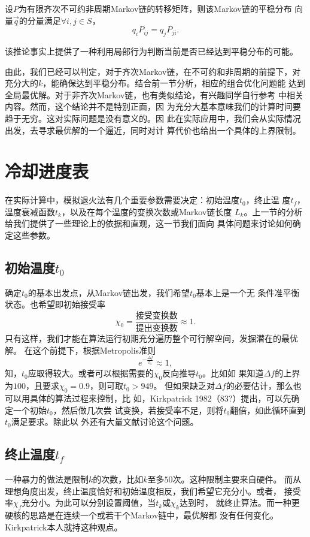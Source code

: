 \begin{corollary}{} 设$P$为有限齐次不可约非周期Markov链的转移矩阵，则该Markov链的平稳分布
  向量$\vec{q}$的分量满足$\forall i, j \in S$，
  \begin{equation}
    q_i P_{ij} = q_j P_{ji}.
  \end{equation}
\end{corollary}
该推论事实上提供了一种利用局部行为判断当前是否已经达到平稳分布的可能。

由此，我们已经可以判定，对于齐次Markov链，在不可约和非周期的前提下，对
充分大的$k$，能确保达到平稳分布。结合前一节分析，相应的组合优化问题能
达到全局最优解。对于非齐次Markov链，也有类似结论，有兴趣同学自行参考
\cite{Aarts1989Simulated}中相关内容。然而，这个结论并不是特别正面，因
为充分大基本意味我们的计算时间要趋于无穷。这对实际问题是没有意义的。因
此在实际应用中，我们会从实际情况出发，去寻求最优解的一个逼近，同时对计
算代价也给出一个具体的上界限制。

\section{冷却进度表}
在实际计算中，模拟退火法有几个重要参数需要决定：初始温度$t_0$，终止温
度$t_f$，温度衰减函数$t_k$，以及在每个温度的变换次数或Markov链长度
$L_k$。上一节的分析给我们提供了一些理论上的依据和直观，这一节我们面向
具体问题来讨论如何确定这些参数。

\subsection{初始温度$t_0$}
确定$t_0$的基本出发点，从Markov链出发，我们希望$t_0$基本上是一个无
条件准平衡状态。也希望即初始接受率
\begin{equation}
  \chi_0 = \frac{\mbox{接受变换数}}{\mbox{提出变换数}} \approx 1.
\end{equation}
只有这样，我们才能在算法运行初期充分遍历整个可行解空间，发掘潜在的最优解。
在这个前提下，根据Metropolis准则
$$
e^{-\frac{\Delta f}{t_0}} \approx 1,
$$
知，$t_0$应取得较大。或者可以根据需要的$\chi_0$反向推导$t_0$。比如如
果知道$\Delta f$的上界为$100$，且要求$\chi_0 = 0.9$，则可取$t_0 > 949$。
但如果缺乏对$\Delta f$的必要估计，那么也可以用具体的算法过程来控制，比
如，Kirkpatrick 1982（83?）提出，可以先确定一个初始$t_0$，然后做几次尝
试变换，若接受率不足，则将$t_0$翻倍，如此循环直到$t_0$满足要求。除此以
外还有大量文献讨论这个问题。

\subsection{终止温度$t_f$}
一种暴力的做法是限制$k$的次数，比如$k$至多$50$次。这种限制主要来自硬件。
而从理想角度出发，终止温度恰好和初始温度相反，我们希望它充分小。或者，
接受率$\chi_f$充分小。为此可以分别设置阈值，当$t_k$或$\chi_k$达到时，
就终止算法。而一种更硬核的思路是在连续一个或若干个Markov链中，最优解都
没有任何变化。Kirkpatrick本人就持这种观点。

